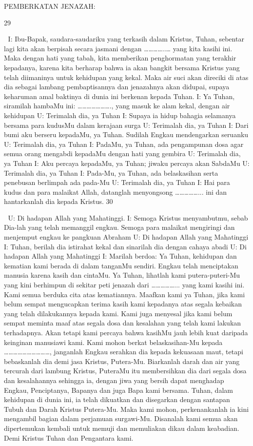 \documentclass[10pt,a5paper,fancyhdr]{memoir}
\begin{document}
PEMBERKATAN JENAZAH: 


29 



I: Ibu-Bapak, saudara-saudariku yang terkasih dalam Kristus, 
Tuhan, sebentar lagi kita akan berpisah secara jasmani dengan 
…………..… yang kita kasihi ini. Maka dengan hati yang tabah, kita 
memberikan penghormatan yang terakhir kepadanya, karena kita 
berharap bahwa ia akan bangkit bersama Kristus yang telah 
diimaninya untuk kehidupan yang kekal. Maka air suci akan direciki 
di atas dia sebagai lambang pembaptisannya dan jenazahnya akan 
didupai, supaya keharuman amal baktinya di dunia ini berkenan 
kepada Tuhan. 
I: Ya Tuhan, siramilah hambaMu ini: …………………., yang 
masuk ke alam kekal, dengan air kehidupan 
U: Terimalah dia, ya Tuhan 
I: Supaya ia hidup bahagia selamanya bersama para kudusMu 
dalam kerajaan surga 
U: Terimalah dia, ya Tuhan 
I: Dari bumi aku berseru kepadaMu, ya Tuhan. Sudilah Engkau 
mendengarkan seruanku 
U: Terimalah dia, ya Tuhan 
I: PadaMu, ya Tuhan, ada pengampunan dosa agar semua orang 
mengabdi kepadaMu dengan hati yang gembira 
U: Terimalah dia, ya Tuhan 
I: Aku percaya kepadaMu, ya Tuhan; jiwaku percaya akan 
SabdaMu 
U: Terimalah dia, ya Tuhan 
I: Pada-Mu, ya Tuhan, ada belaskasihan serta penebusan 
berlimpah ada pada-Mu 
U: Terimalah dia, ya Tuhan 
I: Hai para kudus dan para malaikat Allah, datanglah menyongsong 
……………... ini dan hantarkanlah dia kepada Kristus. 
30 



U: Di hadapan Allah yang Mahatinggi. 
I: Semoga Kristus menyambutmu, sebab Dia-lah yang telah 
memanggil engkau. Semoga para malaikat mengiringi dan 
menjemput engkau ke pangkuan Abraham 
U: Di hadapan Allah yang Mahatinggi 
I: Tuhan, berilah dia istirahat kekal dan sinarilah dia dengan cahaya 
abadi 
U: Di hadapan Allah yang Mahatinggi 
I: Marilah berdoa: 
Ya Tuhan, kehidupan dan kematian kami berada di dalam 
tanganMu sendiri. Engkau telah menciptakan manusia karena kasih 
dan cintaMu. Ya Tuhan, lihatlah kami putera-puteri-Mu yang kini 
berhimpun di sekitar peti jenazah dari ……………... yang kami 
kasihi ini. Kami semua berduka cita atas kematiannya. Maafkan kami 
ya Tuhan, jika kami belum sempat mengucapkan terima kasih kami 
kepadanya atas segala kebaikan yang telah dilakukannya kepada 
kami. Kami juga menyesal jika kami belum sempat meminta maaf 
atas segala dosa dan kesalahan yang telah kami lakukan terhadapnya. 
Akan tetapi kami percaya bahwa kasihMu jauh lebih kuat daripada 
keinginan manusiawi kami. Kami mohon berkat belaskasihan-Mu 
kepada …………………………, janganlah Engkau serahkan dia 
kepada kekuasaan maut, tetapi bebaskanlah dia demi jasa Kristus, 
Putera-Mu. Biarkanlah darah dan air yang tercurah dari lambung 
Kristus, PuteraMu itu membersihkan dia dari segala dosa dan 
kesalahannya sehingga ia, dengan jiwa yang bersih dapat menghadap 
Engkau, Penciptanya, Bapanya dan juga Bapa kami bersama. Tuhan, 
dalam kehidupan di dunia ini, ia telah dikuatkan dan disegarkan 
dengan santapan Tubuh dan Darah Kristus Putera-Mu. Maka kami 
mohon, perkenankanlah ia kini mengambil bagian dalam perjamuan 
surgawi-Mu. Disanalah kami semua akan dipertemukan kembali 
untuk memuji dan memuliakan dikau dalam keabadian. Demi Kristus 
Tuhan dan Pengantara kami. 
\end{document}
